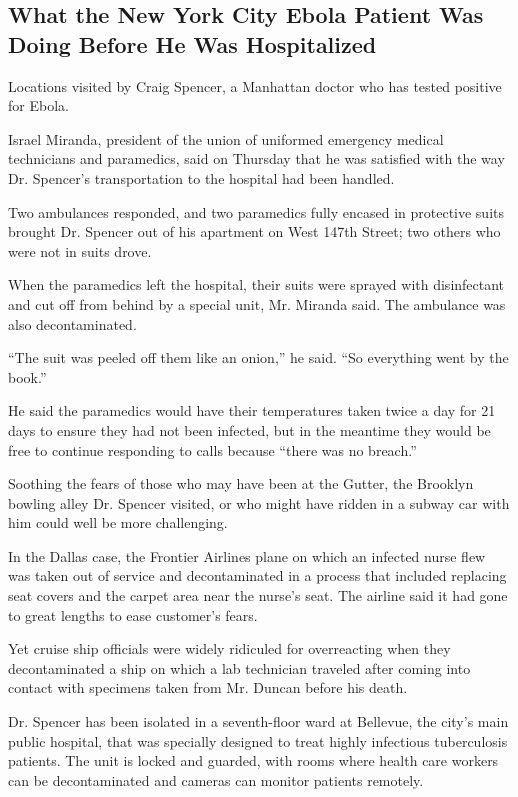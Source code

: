 \hypertarget{what-the-new-york-city-ebola-patient-was-doing-before-he-was-hospitalized}{%
\subsection{What the New York City Ebola Patient Was Doing Before He Was
Hospitalized}\label{what-the-new-york-city-ebola-patient-was-doing-before-he-was-hospitalized}}

Locations visited by Craig Spencer, a Manhattan doctor who has tested
positive for Ebola.

Israel Miranda, president of the union of uniformed emergency medical
technicians and paramedics, said on Thursday that he was satisfied with
the way Dr. Spencer's transportation to the hospital had been handled.

Two ambulances responded, and two paramedics fully encased in protective
suits brought Dr. Spencer out of his apartment on West 147th Street; two
others who were not in suits drove.

When the paramedics left the hospital, their suits were sprayed with
disinfectant and cut off from behind by a special unit, Mr. Miranda
said. The ambulance was also decontaminated.

``The suit was peeled off them like an onion,'' he said. ``So everything
went by the book.''

He said the paramedics would have their temperatures taken twice a day
for 21 days to ensure they had not been infected, but in the meantime
they would be free to continue responding to calls because ``there was
no breach.''

Soothing the fears of those who may have been at the Gutter, the
Brooklyn bowling alley Dr. Spencer visited, or who might have ridden in
a subway car with him could well be more challenging.

In the Dallas case, the Frontier Airlines plane on which an infected
nurse flew was taken out of service and decontaminated in a process that
included replacing seat covers and the carpet area near the nurse's
seat. The airline said it had gone to great lengths to ease customer's
fears.

Yet cruise ship officials were widely ridiculed for overreacting when
they decontaminated a ship on which a lab technician traveled after
coming into contact with specimens taken from Mr. Duncan before his
death.

Dr. Spencer has been isolated in a seventh-floor ward at Bellevue, the
city's main public hospital, that was specially designed to treat highly
infectious tuberculosis patients. The unit is locked and guarded, with
rooms where health care workers can be decontaminated and cameras can
monitor patients remotely.

